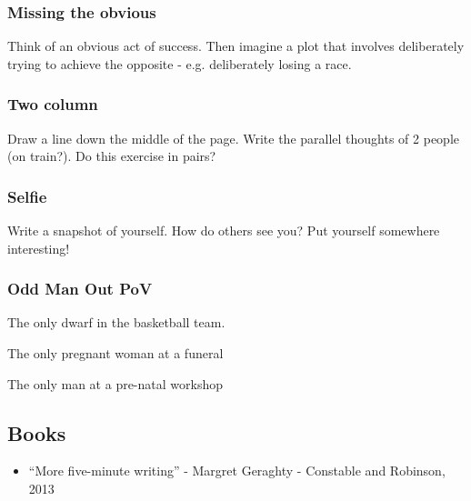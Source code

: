 \documentclass[11pt]{article}
\begin{document}
\subsubsection*{Missing the obvious}
Think of an obvious act of success. Then imagine a plot that involves deliberately trying to achieve the opposite - e.g. deliberately losing a race. 

\subsubsection*{Two column}
Draw a line down the middle of the page. Write the parallel thoughts of 2 people (on train?). Do this exercise in pairs?

\subsubsection*{Selfie}
Write a snapshot of yourself. How do others see you?  Put yourself somewhere interesting!

\subsubsection*{Odd Man Out PoV}
The only dwarf in the basketball team. 

The only pregnant woman at a funeral

The only man at a pre-natal workshop

\subsection*{Books}
\begin{itemize}
\item ``More five-minute writing'' - Margret Geraghty  - Constable and Robinson, 2013

\end{itemize}
\end{document}
